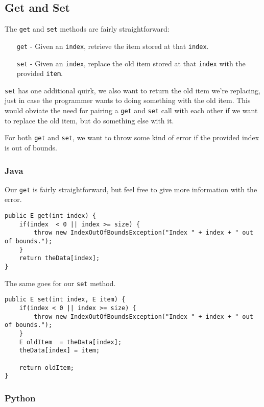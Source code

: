\subsection{Get and Set}
The \texttt{get} and \texttt{set} methods are fairly straightforward:
\begin{enumerate}
\item[\texttt{get} -] Given an \texttt{index}, retrieve the item stored at that \texttt{index}.
\item[\texttt{set} -] Given an \texttt{index}, replace the old item stored at that \texttt{index} with the provided \texttt{item}.
\end{enumerate}
\texttt{set} has one additional quirk, we also want to return the old item we're replacing, just in case the programmer wants to doing something with the old item.
This would obviate the need for pairing a \texttt{get} and \texttt{set} call with each other if we want to replace the old item, but do something else with it. 

For both \texttt{get} and \texttt{set}, we want to throw some kind of error if the provided index is out of bounds.
\subsubsection{Java}
Our \texttt{get} is fairly straightforward, but feel free to give more information with the error.
\begin{verbatim}
public E get(int index) {
	if(index  < 0 || index >= size) {
		throw new IndexOutOfBoundsException("Index " + index + " out of bounds.");
	}
	return theData[index];
}
\end{verbatim}

The same goes for our \texttt{set} method. 
\begin{verbatim}
public E set(int index, E item) {
	if(index < 0 || index >= size) {
		throw new IndexOutOfBoundsException("Index " + index + " out of bounds.");
	}
	E oldItem  = theData[index];
	theData[index] = item;
	
	return oldItem;
}
\end{verbatim}

\subsubsection{Python}

